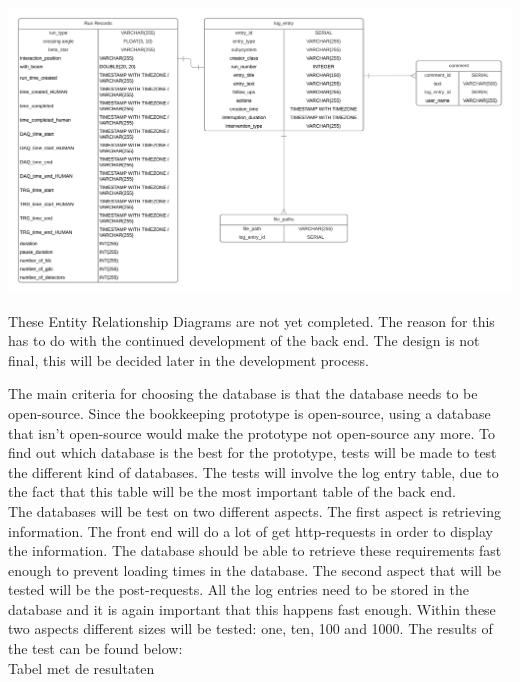 \documentclass[paper=a4, fontsize=11pt,twoside]{scrartcl}	%
\begin{document}
\includegraphics[scale=0.5]{ERDLogEntry}

These Entity Relationship Diagrams are not yet completed. The reason for this has to do with the continued development of the back end. The design is not final, this will be decided later in the development process. 

The main criteria for choosing the database is that the database needs to be open-source. Since the bookkeeping prototype is open-source, using a database that isn't open-source would make the prototype not open-source any more. To find out which database is the best for the prototype, tests will be made to test the different kind of databases. The tests will involve the log entry table, due to the fact that this table will be the most important table of the  back end. \\
The databases will be test on two different aspects. The first aspect is retrieving information. The front end will do a lot of get http-requests in order to display the information. The database should be able to retrieve these requirements fast enough to prevent loading times in the database. The second aspect that will be tested will be the post-requests. All the log entries need to be stored in the database and it is again important that this happens fast enough. Within these two aspects different sizes will be tested: one, ten, 100 and 1000. The results of the test can be found below: \\

Tabel met de resultaten \\



\newpage
\end{document}
